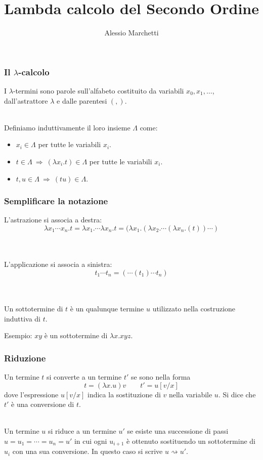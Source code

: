 \documentclass{beamer}
\title[Lambda calcolo]{Lambda calcolo del Secondo Ordine}
\author{Alessio Marchetti}
\date{}
\newcommand{\conv}{\rightsquigarrow}
\begin{document}
\frame{\titlepage}

\begin{frame}
    \frametitle{Il $\lambda$-calcolo} I $\lambda$-termini sono parole
    sull'alfabeto costituito da variabili $x_0, x_1, \dots$, dall'astrattore
    $\lambda$ e dalle parentesi $(,)$. 
\\~\

    Definiamo induttivamente il loro insieme $\Lambda$ come:
    \begin{itemize}
        \item $x_i \in \Lambda$ per tutte le variabili $x_i$.
        \item $t\in \Lambda\ \Rightarrow\ (\lambda x_i.t)\in\Lambda$ per tutte
            le variabili $x_i$.
        \item $t,u\in \Lambda\ \Rightarrow\ (tu)\in \Lambda$.
    \end{itemize}
\end{frame}

\begin{frame}
    \frametitle{Semplificare la notazione}
    L'astrazione si associa a destra:
    \[
        \lambda x_1\cdots x_n.t = \lambda x_1. \cdots \lambda x_n.t = (\lambda
        x_1.(\lambda x_2.\cdots (\lambda x_n.(t))\cdots)
    \]
    \\~\

    L'applicazione si associa a sinistra:
    \[
        t_1\cdots t_n = (\cdots(t_1)\cdots t_n) 
    \]
    \\~\
    
    Un sottotermine di $t$ \`e un qualunque termine $u$ utilizzato nella
    costruzione induttiva di $t$. 

    Esempio: $xy$ \`e un sottotermine di $\lambda x. xyz$.
\end{frame}

\begin{frame}
    \frametitle{Riduzione}
    Un termine $t$ si converte a un termine $t'$ se sono nella forma
    \[
        t = (\lambda x. u)v \qquad t' = u[v/x]
    \]
    dove l'espressione $u[v/x]$ indica la sostituzione di $v$ nella variabile
    $u$. Si dice che $t'$ \`e una conversione di $t$.
    \\~\

    Un termine $u$ si riduce a un termine $u'$ se esiste una successione di
    passi $u = u_1 = \cdots = u_n = u'$ in cui ogni $u_{i+1}$ \`e ottenuto
    sostituendo un sottotermine di $u_i$ con una sua conversione. In questo caso
    si scrive $u \conv u'$.
\end{frame}
\end{document}
